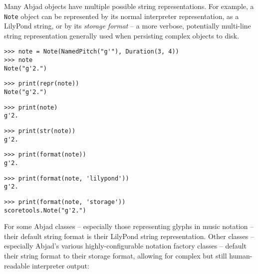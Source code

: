 \noindent Many Abjad objects have multiple possible string representations. For
example, a \texttt{Note} object can be represented by its normal interpreter
representation, as a LilyPond string, or by its \emph{storage format} -- a more
verbose, potentially multi-line string representation generally used when
persisting complex objects to disk.

\begin{comment}
<abjad>
note = Note(NamedPitch("g'"), Duration(3, 4))
note
print(repr(note))
print(note)
print(str(note))
print(format(note))
print(format(note, 'lilypond'))
print(format(note, 'storage'))
</abjad>
\end{comment}

\begin{abjadbookoutput}
\begin{singlespacing}
\vspace{-0.5\baselineskip}
\begin{lstlisting}
>>> note = Note(NamedPitch("g'"), Duration(3, 4))
>>> note
Note("g'2.")
\end{lstlisting}
\begin{lstlisting}
>>> print(repr(note))
Note("g'2.")
\end{lstlisting}
\begin{lstlisting}
>>> print(note)
g'2.
\end{lstlisting}
\begin{lstlisting}
>>> print(str(note))
g'2.
\end{lstlisting}
\begin{lstlisting}
>>> print(format(note))
g'2.
\end{lstlisting}
\begin{lstlisting}
>>> print(format(note, 'lilypond'))
g'2.
\end{lstlisting}
\begin{lstlisting}
>>> print(format(note, 'storage'))
scoretools.Note("g'2.")
\end{lstlisting}
\end{singlespacing}
\end{abjadbookoutput}

\noindent For some Abjad classes -- especially those representing glyphs in
music notation -- their default string format is their LilyPond string
representation. Other classes -- especially Abjad's various highly-configurable
notation factory classes -- default their string format to their storage
format, allowing for complex but still human-readable interpreter output:

